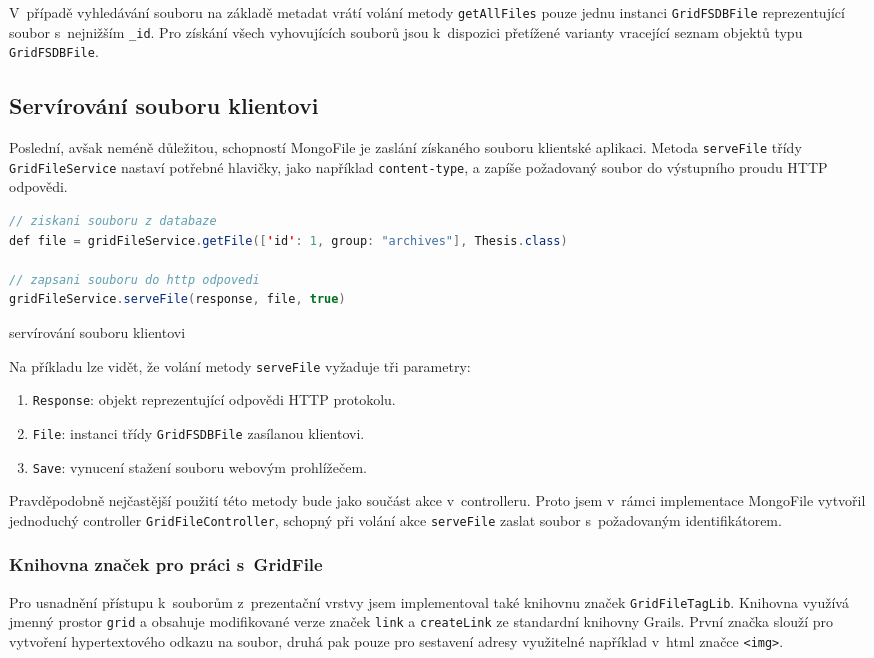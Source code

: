 V~případě vyhledávání souboru na základě metadat vrátí volání metody \texttt{getAllFiles} pouze jednu instanci \texttt{GridFSDBFile} reprezentující soubor s~nejnižším \texttt{\_id}. Pro získání všech vyhovujících souborů jsou k~dispozici přetížené varianty vracející seznam objektů typu \texttt{GridFSDBFile}.

\subsection{Servírování souboru klientovi}
Poslední, avšak neméně důležitou, schopností MongoFile je zaslání získaného souboru klientské aplikaci. Metoda \texttt{serveFile} třídy \texttt{GridFileService} nastaví potřebné hlavičky, jako například \texttt{content-type}, a zapíše požadovaný soubor do výstupního proudu HTTP odpovědi.
\begin{example}
\centering
\begin{lstlisting}[language=Java]
// ziskani souboru z databaze
def file = gridFileService.getFile(['id': 1, group: "archives"], Thesis.class)

// zapsani souboru do http odpovedi
gridFileService.serveFile(response, file, true)
\end{lstlisting}
\caption{servírování souboru klientovi}
\end{example}
Na příkladu lze vidět, že volání metody \texttt{serveFile} vyžaduje tři parametry:
\begin{enumerate}
\item \texttt{Response}: objekt reprezentující odpovědi HTTP protokolu.
\item \texttt{File}: instanci třídy \texttt{GridFSDBFile} zasílanou klientovi.
\item \texttt{Save}: vynucení stažení souboru webovým prohlížečem.
\end{enumerate}
Pravděpodobně nejčastější použití této metody bude jako součást akce v~controlleru. Proto jsem v~rámci implementace MongoFile vytvořil jednoduchý controller \texttt{GridFileController}, schopný při volání akce \texttt{serveFile} zaslat soubor s~požadovaným identifikátorem.

\subsubsection{\textbf{Knihovna značek pro práci s~GridFile}}
Pro usnadnění přístupu k~souborům z~prezentační vrstvy jsem implementoval také knihovnu značek \texttt{GridFileTagLib}. Knihovna využívá jmenný prostor \texttt{grid} a obsahuje modifikované verze značek \texttt{link} a \texttt{createLink} ze standardní knihovny Grails. První značka slouží pro vytvoření hypertextového odkazu na soubor, druhá pak pouze pro sestavení adresy využitelné například v~html značce \texttt{<img>}.

